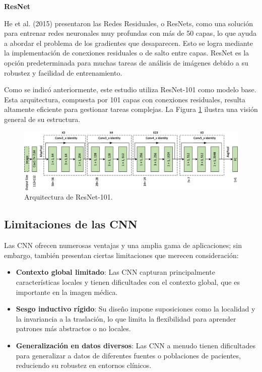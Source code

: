 \documentclass[a4paper,10pt]{book}
\begin{document}
\textbf{ResNet}

He et al. (2015) \cite{he_deep_2015} presentaron las Redes Residuales, o ResNets, como una solución para entrenar redes neuronales muy profundas con más de 50 capas, lo que ayuda a abordar el problema de los gradientes que desaparecen. Esto se logra mediante la implementación de conexiones residuales o de salto entre capas. ResNet es la opción predeterminada para muchas tareas de análisis de imágenes debido a su robustez y facilidad de entrenamiento.

Como se indicó anteriormente, este estudio utiliza ResNet-101 como modelo base. Esta arquitectura, compuesta por 101 capas con conexiones residuales, resulta altamente eficiente para gestionar tareas complejas. La Figura \ref{fig:resnet_101} ilustra una visión general de su estructura.

\begin{figure}[h!]
\centering
\includegraphics[width=0.75\linewidth]{reports//assets/resnet101.jpg}
\caption[ResNet-101 Architecture]{Arquitectura de ResNet-101.}
\label{fig:resnet_101}
\end{figure}

\subsection{Limitaciones de las CNN}

Las CNN ofrecen numerosas ventajas y una amplia gama de aplicaciones; sin embargo, también presentan ciertas limitaciones que merecen consideración:


\begin{itemize}
\item \textbf{Contexto global limitado}: Las CNN capturan principalmente características locales y tienen dificultades con el contexto global, que es importante en la imagen médica.
\item \textbf{Sesgo inductivo rígido}: Su diseño impone suposiciones como la localidad y la invariancia a la traslación, lo que limita la flexibilidad para aprender patrones más abstractos o no locales.

\item \textbf{Generalización en datos diversos}: Las CNN a menudo tienen dificultades para generalizar a datos de diferentes fuentes o poblaciones de pacientes, reduciendo su robustez en entornos clínicos.
\end{itemize}
\end{document}
